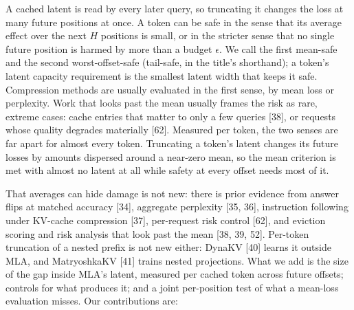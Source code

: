 \documentclass[11pt]{article}
\begin{document}
A cached latent is read by every later query, so truncating it changes the loss at many future positions at once. A token can be safe in the sense that its average effect over the next $H$ positions is small, or in the stricter sense that no single future position is harmed by more than a budget $\epsilon$. We call the first mean-safe and the second worst-offset-safe (tail-safe, in the title's shorthand); a token's latent capacity requirement is the smallest latent width that keeps it safe. Compression methods are usually evaluated in the first sense, by mean loss or perplexity. Work that looks past the mean usually frames the risk as rare, extreme cases: cache entries that matter to only a few queries [38], or requests whose quality degrades materially [62]. Measured per token, the two senses are far apart for almost every token. Truncating a token's latent changes its future losses by amounts dispersed around a near-zero mean, so the mean criterion is met with almost no latent at all while safety at every offset needs most of it.

That averages can hide damage is not new: there is prior evidence from answer flips at matched accuracy [34], aggregate perplexity [35, 36], instruction following under KV-cache compression [37], per-request risk control [62], and eviction scoring and risk analysis that look past the mean [38, 39, 52]. Per-token truncation of a nested prefix is not new either: DynaKV [40] learns it outside MLA, and MatryoshkaKV [41] trains nested projections. What we add is the size of the gap inside MLA's latent, measured per cached token across future offsets; controls for what produces it; and a joint per-position test of what a mean-loss evaluation misses. Our contributions are:
\end{document}
